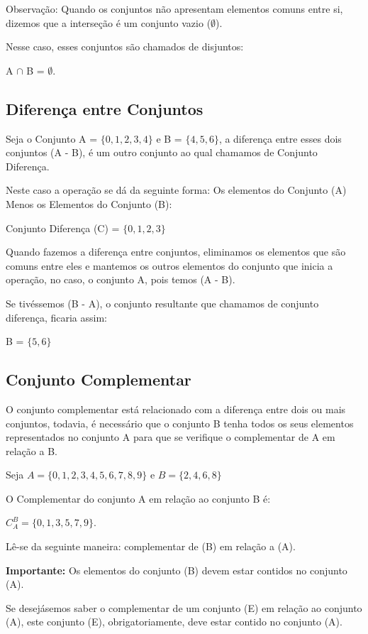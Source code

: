 \begin{multicols*}{2}
    Observação: Quando os conjuntos não apresentam elementos comuns entre si, dizemos que a interseção é um conjunto vazio ($\emptyset$).

    Nesse caso, esses conjuntos são chamados de disjuntos:

    A $ \cap $ B = $\emptyset$.

    \subsection{Diferença entre Conjuntos}

    Seja o Conjunto A = $\{{ 0, 1, 2, 3, 4 }\}$ e B = $\{ 4, 5, 6 \}$, a diferença entre esses dois conjuntos (A - B), é um outro conjunto ao qual chamamos de Conjunto Diferença.

    Neste caso a operação se dá da seguinte forma: Os elementos do Conjunto (A) Menos os Elementos do Conjunto (B):

    Conjunto Diferença (C) = $\{ 0, 1, 2, 3 \}$

    Quando fazemos a diferença entre conjuntos, eliminamos os elementos que são comuns entre eles e mantemos os outros elementos do conjunto que inicia a operação, no caso, o conjunto A, pois temos (A - B).

    Se tivéssemos (B - A), o conjunto resultante que chamamos de conjunto diferença, ficaria assim:

    B = $\{ 5, 6 \}$

    \subsection{Conjunto Complementar}

    O conjunto complementar está relacionado com a diferença entre dois ou mais conjuntos, todavia, é necessário que o conjunto B tenha todos os seus elementos representados no conjunto A para que se verifique o complementar de A em relação a B.

    Seja $ A =\{0,1, 2, 3, 4, 5, 6, 7, 8, 9\} $ e $ B = \{ 2, 4, 6, 8\} $

    O Complementar do conjunto A em relação ao conjunto B é:

    $ C_A^B = \{0, 1, 3, 5, 7, 9 \} $.

    Lê-se da seguinte maneira: complementar de (B) em relação a (A).

    \textbf{Importante:} Os elementos do conjunto (B) devem estar contidos no conjunto (A).

    Se desejásemos saber o complementar de um conjunto (E) em relação ao conjunto (A), este conjunto (E), obrigatoriamente, deve estar contido no conjunto (A).


\end{multicols*}
